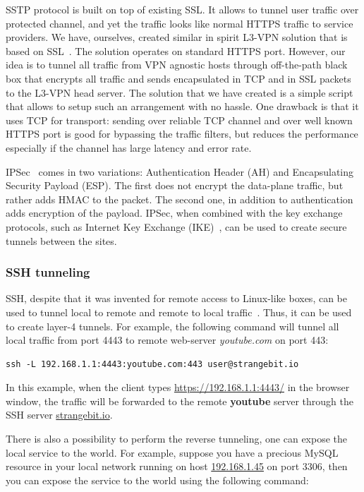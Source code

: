 SSTP protocol is built on top of existing SSL. It allows to tunnel user traffic over protected 
channel, and yet the traffic looks like normal HTTPS traffic to service providers.
We have, ourselves, created similar in spirit L3-VPN solution that is based on SSL~\cite{ssl:vpn}.
The solution operates on standard HTTPS port. However, our idea is to tunnel all traffic from VPN 
agnostic hosts through off-the-path black box that encrypts all traffic and sends encapsulated in TCP and in SSL
packets to the L3-VPN head server. The solution that we have created is a simple script 
that allows to setup such an arrangement with no hassle. One drawback is that it 
uses TCP for transport: sending over reliable TCP channel and over well known HTTPS port
is good for bypassing the traffic filters, but reduces the performance especially if
the channel has large latency and error rate. 

IPSec~\cite{tcpip} comes in two variations: Authentication Header (AH) and Encapsulating Security Payload (ESP).
The first does not encrypt the data-plane traffic, but rather adds HMAC to the packet. The second one, in
addition to authentication adds encryption of the payload. IPSec, when combined with the key exchange 
protocols, such as Internet Key Exchange (IKE)~\cite{rfc4306}, can be used to create secure tunnels between the sites.

\subsubsection{SSH tunneling}

SSH, despite that it was invented for remote access to Linux-like boxes, can be used 
to tunnel local to remote and remote to local traffic~\cite{ssh:tunneling}. Thus, it can be used to create
layer-4 tunnels. For example, the following command will tunnel all local traffic from
port 4443 to remote web-server {\it youtube.com} on port 443:

\begin{verbatim}
ssh -L 192.168.1.1:4443:youtube.com:443 user@strangebit.io
\end{verbatim}

In this example, when the client types \url{https://192.168.1.1:4443/} in the browser window,
the traffic will be forwarded to the remote {\bf youtube} server through the SSH server \url{strangebit.io}.

There is also a possibility to perform the reverse tunneling, \ie one can expose the local service to the world.
For example, suppose you have a precious MySQL resource in your local network running on host \url{192.168.1.45} 
on port $3306$, then you can expose the service to the world using the following command:

